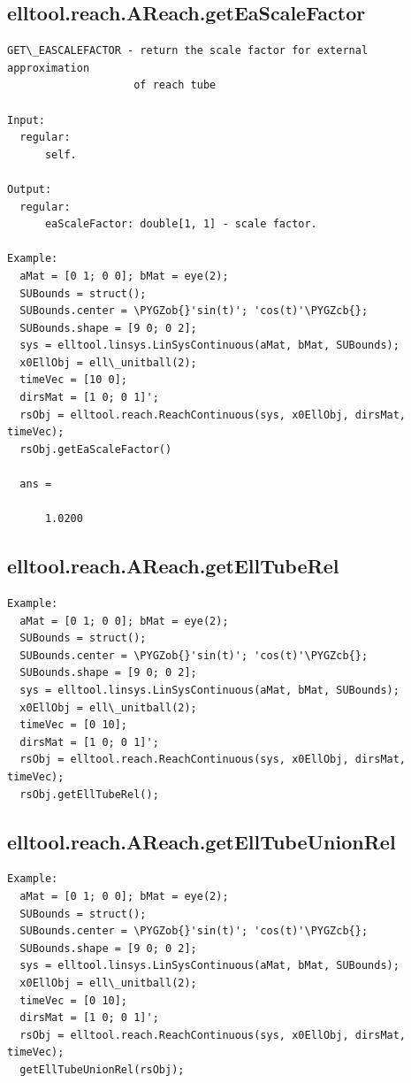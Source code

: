 \documentclass[letterpaper,10pt,english]{sphinxmanual}
\def\PYGZob{\char`\{}
\def\PYGZcb{\char`\}}
\begin{document}
\subsection{elltool.reach.AReach.getEaScaleFactor}
\label{chap_functions:elltool-reach-areach-geteascalefactor}
\begin{Verbatim}[commandchars=\\\{\}]
GET\_EASCALEFACTOR - return the scale factor for external approximation
                    of reach tube

Input:
  regular:
      self.

Output:
  regular:
      eaScaleFactor: double[1, 1] - scale factor.

Example:
  aMat = [0 1; 0 0]; bMat = eye(2);
  SUBounds = struct();
  SUBounds.center = \PYGZob{}'sin(t)'; 'cos(t)'\PYGZcb{};
  SUBounds.shape = [9 0; 0 2];
  sys = elltool.linsys.LinSysContinuous(aMat, bMat, SUBounds);
  x0EllObj = ell\_unitball(2);
  timeVec = [10 0];
  dirsMat = [1 0; 0 1]';
  rsObj = elltool.reach.ReachContinuous(sys, x0EllObj, dirsMat, timeVec);
  rsObj.getEaScaleFactor()

  ans =

      1.0200
\end{Verbatim}


\subsection{elltool.reach.AReach.getEllTubeRel}
\label{chap_functions:elltool-reach-areach-getelltuberel}
\begin{Verbatim}[commandchars=\\\{\}]
Example:
  aMat = [0 1; 0 0]; bMat = eye(2);
  SUBounds = struct();
  SUBounds.center = \PYGZob{}'sin(t)'; 'cos(t)'\PYGZcb{};
  SUBounds.shape = [9 0; 0 2];
  sys = elltool.linsys.LinSysContinuous(aMat, bMat, SUBounds);
  x0EllObj = ell\_unitball(2);
  timeVec = [0 10];
  dirsMat = [1 0; 0 1]';
  rsObj = elltool.reach.ReachContinuous(sys, x0EllObj, dirsMat, timeVec);
  rsObj.getEllTubeRel();
\end{Verbatim}


\subsection{elltool.reach.AReach.getEllTubeUnionRel}
\label{chap_functions:elltool-reach-areach-getelltubeunionrel}
\begin{Verbatim}[commandchars=\\\{\}]
Example:
  aMat = [0 1; 0 0]; bMat = eye(2);
  SUBounds = struct();
  SUBounds.center = \PYGZob{}'sin(t)'; 'cos(t)'\PYGZcb{};
  SUBounds.shape = [9 0; 0 2];
  sys = elltool.linsys.LinSysContinuous(aMat, bMat, SUBounds);
  x0EllObj = ell\_unitball(2);
  timeVec = [0 10];
  dirsMat = [1 0; 0 1]';
  rsObj = elltool.reach.ReachContinuous(sys, x0EllObj, dirsMat, timeVec);
  getEllTubeUnionRel(rsObj);
\end{Verbatim}
\end{document}
